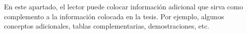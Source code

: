 
En este apartado, el lector puede colocar información adicional que sirva como complemento a la información colocada en la tesis. Por ejemplo, algunos conceptos adicionales, tablas complementarias, demostraciones, etc.
